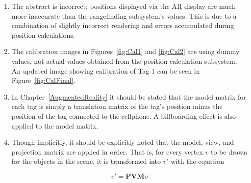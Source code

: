 \begin{enumerate}
	\item The abstract is incorrect; positions displayed via the AR display are much more inaccurate than the rangefinding subsystem's values. This is due to a combination of slightly incorrect rendering and errors accumulated during position calculations.
	\item The calibration images in Figures~\ref{fig:Cal1} and \ref{fig:Cal2} are using dummy values, not actual values obtained from the position calculation subsystem. An updated image showing calibration of Tag 1 can be seen in Figure~\ref{fig:CalFinal}.
	\item In Chapter~\ref{AugmentedReality} it should be stated that the model matrix for each tag is simply a translation matrix of the tag's position minus the position of the tag connected to the cellphone. A billboarding effect is also applied to the model matrix.
	\item Though implicitly, it should be explicitly noted that the model, view, and projection matrix are applied in order. That is, for every vertex $v$ to be drawn for the objects in the scene, it is transformed into $v'$ with the equation
	
	\[ v' = \mathbf{P}\mathbf{V}\mathbf{M}v \]
\end{enumerate}
